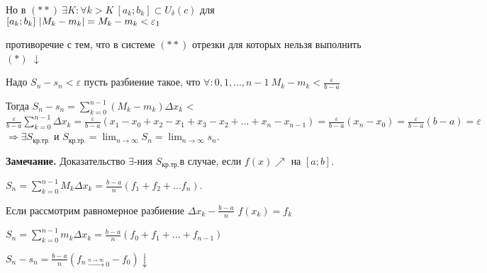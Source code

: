 \documentclass{article}
\begin{document}
    Но в $(**)\ \exists K : \forall k > K\ [a_k;b_k] \subset U_\delta(c)$ для \([a_k;b_k]\ \abs{M_k-m_k} = M_k - m_k < \varepsilon_1\)
    
    противоречие с тем, что в системе $(**)$ отрезки для которых нельзя выполнить $(*)$ \(\downarrow\)

    Надо \( S_n - s_n < \varepsilon \)
    пусть разбиение такое, что \( \forall: 0,1,...,n-1 \ M_k - m_k < \frac{\varepsilon}{b-a} \)
    
    Тогда \(S_n-s_n = \sum_{k=0}^{n-1} (M_k-m_k)\Delta x_k\) < \( \frac{\varepsilon}{b-a} \sum_{k=0}^{n-1} \Delta x_k = \frac{\varepsilon}{b-a}(x_1 - x_0 +x_2 - x_1 + x_3 - x_2 + ... + x_n - x_{n-1}) = \frac{\varepsilon}{b-a}(x_n - x_0) = \frac{\varepsilon}{b-a} (b - a) = \varepsilon\)
    \( \Rightarrow \exists S_{\textrm{кр.тр.}} \)  и \( S_{\textrm{кр.тр.}} = \lim_{n \to \infty}S_n = \lim_{n \to \infty}s_n \).

    \textbf{Замечание.} Доказательство \(\exists\)-ния \(S_\textrm{кр.тр.}\)в случае, если \(f(x) \nearrow\) на \([a;b]\).

    \(S_n = \sum_{k=0}^{n-1} M_k \Delta x_k = \frac{b-a}{n}(f_1 + f_2+...f_n)\).

    Если рассмотрим равномерное разбиение \(\Delta x_k - \frac{b-a}{n}\) \(f(x_k) = f_k\) 

    \( S_n = \sum_{k=0}^{n-1} m_k \Delta x_k = \frac{b-a}{n} (f_0 + f_1 + ... + f_{n-1})\)

    \(S_n-s_n = \frac{b-a}{n}({f_n}_{\overset{n\rightarrow \infty}{\rightarrow} 0}-f_0) \downarrow\)
\end{document}
